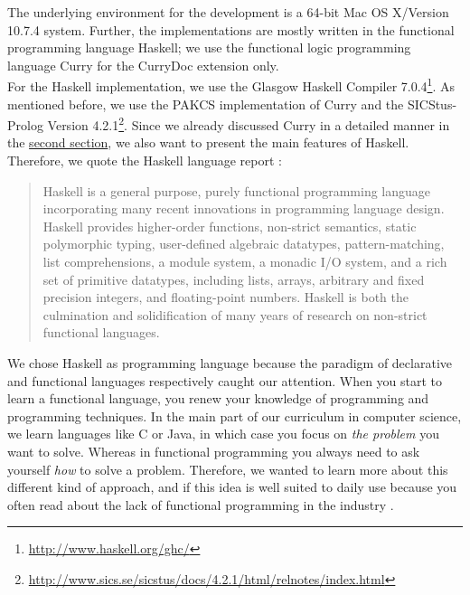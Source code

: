 \documentclass[%
	latex,%
	a4paper,%
	oneside,%
	chapterprefix,%
	headsepline,%
	12pt%
]{scrbook}
\begin{document}
The underlying environment for the development is a 64-bit Mac OS
X/Version 10.7.4 system. %
Further, the implementations are mostly written in the functional programming
language Haskell; we use the functional logic programming language
Curry for the CurryDoc extension only.\\
For the Haskell implementation, we use the Glasgow Haskell Compiler
7.0.4\footnote{\url{http://www.haskell.org/ghc/}}. %
As mentioned before, we use the PAKCS implementation of Curry and the
SICStus-Prolog Version
4.2.1\footnote{\url{http://www.sics.se/sicstus/docs/4.2.1/html/relnotes/index.html}}. %
Since we already discussed Curry in a detailed manner in the
\hyperref[preliminaries:curry]{second section}, we also want to present
the main features of Haskell. %
Therefore, we quote the Haskell language report \cite{haskellreport}:
\begin{quote}
  Haskell is a general purpose, purely functional programming language
  incorporating many recent innovations in programming language
  design. Haskell provides higher-order functions, non-strict
  semantics, static polymorphic typing, user-defined algebraic
  datatypes, pattern-matching, list comprehensions, a module system,
  a monadic I/O system, and a rich set of primitive datatypes,
  including lists, arrays, arbitrary and fixed precision integers, and
  floating-point numbers. Haskell is both the culmination and
  solidification of many years of research on non-strict functional
  languages.
\end{quote}

We chose Haskell as programming language because the paradigm of
declarative and functional languages respectively caught our
attention. %
When you start to learn a functional language, you renew your
knowledge of programming and programming techniques. %
In the main part of our curriculum in computer science, we learn
languages like C or Java, in which case you focus on \emph{the
  problem} you want to solve. %
Whereas in functional programming you always need to ask yourself
\emph{how} to solve a problem. %
Therefore, we wanted to learn more about this different kind of
approach, and if this idea is well suited to daily use because you
often read about the lack of functional programming in the industry \cite{noone}. %

\end{document}
